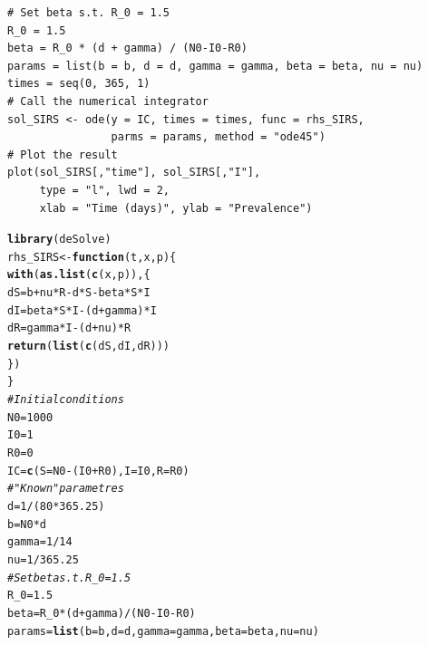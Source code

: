 \documentclass[aspectratio=169]{beamer}\usepackage[]{graphicx}\usepackage[]{xcolor}
\makeatletter
\newcommand{\hlnum}[1]{\textcolor[rgb]{0.686,0.059,0.569}{#1}}%
\newcommand{\hlcom}[1]{\textcolor[rgb]{0.678,0.584,0.686}{\textit{#1}}}%
\newcommand{\hlopt}[1]{\textcolor[rgb]{0,0,0}{#1}}%
\newcommand{\hldef}[1]{\textcolor[rgb]{0.345,0.345,0.345}{#1}}%
\newcommand{\hlkwa}[1]{\textcolor[rgb]{0.161,0.373,0.58}{\textbf{#1}}}%
\newcommand{\hlkwb}[1]{\textcolor[rgb]{0.69,0.353,0.396}{#1}}%
\newcommand{\hlkwc}[1]{\textcolor[rgb]{0.333,0.667,0.333}{#1}}%
\newcommand{\hlkwd}[1]{\textcolor[rgb]{0.737,0.353,0.396}{\textbf{#1}}}%
\newenvironment{kframe}{%
 \def\at@end@of@kframe{}%
 \ifinner\ifhmode%
  \def\at@end@of@kframe{\end{minipage}}%
  \begin{minipage}{\columnwidth}%
 \fi\fi%
 \def\FrameCommand##1{\hskip\@totalleftmargin \hskip-\fboxsep
 \colorbox{shadecolor}{##1}\hskip-\fboxsep
     \hskip-\linewidth \hskip-\@totalleftmargin \hskip\columnwidth}%
 \MakeFramed {\advance\hsize-\width
   \@totalleftmargin\z@ \linewidth\hsize
   \@setminipage}}%
 {\par\unskip\endMakeFramed%
 \at@end@of@kframe}
\newenvironment{knitrout}{}{} %
\makeatother
\begin{document}
\begin{frame}[fragile]
\begin{lstlisting}
# Set beta s.t. R_0 = 1.5
R_0 = 1.5
beta = R_0 * (d + gamma) / (N0-I0-R0)
params = list(b = b, d = d, gamma = gamma, beta = beta, nu = nu)
times = seq(0, 365, 1)
# Call the numerical integrator
sol_SIRS <- ode(y = IC, times = times, func = rhs_SIRS, 
                parms = params, method = "ode45")
# Plot the result
plot(sol_SIRS[,"time"], sol_SIRS[,"I"], 
     type = "l", lwd = 2,
     xlab = "Time (days)", ylab = "Prevalence")
\end{lstlisting}
\end{frame}

\begin{knitrout}
\color{fgcolor}\begin{kframe}
\begin{alltt}
\hlkwd{library}\hldef{(deSolve)}
\hldef{rhs_SIRS} \hlkwb{<-} \hlkwa{function}\hldef{(}\hlkwc{t}\hldef{,} \hlkwc{x}\hldef{,} \hlkwc{p}\hldef{) \{}
  \hlkwd{with}\hldef{(}\hlkwd{as.list}\hldef{(}\hlkwd{c}\hldef{(x, p)), \{}
    \hldef{dS} \hlkwb{=} \hldef{b} \hlopt{+} \hldef{nu} \hlopt{*} \hldef{R} \hlopt{-} \hldef{d} \hlopt{*} \hldef{S} \hlopt{-} \hldef{beta} \hlopt{*} \hldef{S} \hlopt{*} \hldef{I}
    \hldef{dI} \hlkwb{=} \hldef{beta} \hlopt{*} \hldef{S} \hlopt{*} \hldef{I} \hlopt{-} \hldef{(d} \hlopt{+} \hldef{gamma)} \hlopt{*} \hldef{I}
    \hldef{dR} \hlkwb{=} \hldef{gamma} \hlopt{*} \hldef{I} \hlopt{-} \hldef{(d} \hlopt{+} \hldef{nu)} \hlopt{*} \hldef{R}
    \hlkwd{return}\hldef{(}\hlkwd{list}\hldef{(}\hlkwd{c}\hldef{(dS, dI, dR)))}
  \hldef{\})}
\hldef{\}}
\hlcom{# Initial conditions}
\hldef{N0} \hlkwb{=} \hlnum{1000}
\hldef{I0} \hlkwb{=} \hlnum{1}
\hldef{R0} \hlkwb{=} \hlnum{0}
\hldef{IC} \hlkwb{=} \hlkwd{c}\hldef{(}\hlkwc{S} \hldef{= N0}\hlopt{-}\hldef{(I0}\hlopt{+}\hldef{R0),} \hlkwc{I} \hldef{= I0,} \hlkwc{R} \hldef{= R0)}
\hlcom{# "Known" parametres}
\hldef{d} \hlkwb{=} \hlnum{1}\hlopt{/}\hldef{(}\hlnum{80}\hlopt{*}\hlnum{365.25}\hldef{)}
\hldef{b} \hlkwb{=} \hldef{N0} \hlopt{*} \hldef{d}
\hldef{gamma} \hlkwb{=} \hlnum{1}\hlopt{/}\hlnum{14}
\hldef{nu} \hlkwb{=} \hlnum{1}\hlopt{/}\hlnum{365.25}
\hlcom{# Set beta s.t. R_0 = 1.5}
\hldef{R_0} \hlkwb{=} \hlnum{1.5}
\hldef{beta} \hlkwb{=} \hldef{R_0} \hlopt{*} \hldef{(d} \hlopt{+} \hldef{gamma)} \hlopt{/} \hldef{(N0}\hlopt{-}\hldef{I0}\hlopt{-}\hldef{R0)}
\hldef{params} \hlkwb{=} \hlkwd{list}\hldef{(}\hlkwc{b} \hldef{= b,} \hlkwc{d} \hldef{= d,} \hlkwc{gamma} \hldef{= gamma,} \hlkwc{beta} \hldef{= beta,} \hlkwc{nu} \hldef{= nu)}

\end{alltt}
\end{kframe}
\end{knitrout}
\end{document}
